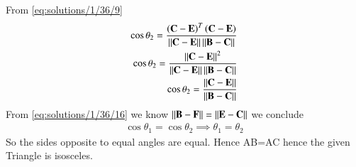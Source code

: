         From {\eqref{eq:solutions/1/36/9}}
        \begin{align}
          \cos{\theta_2}=\frac{\left(\mathbf{C}-\mathbf{E}\right)^T\left(\mathbf{C}-\mathbf{E}\right)}{\left\lVert\mathbf{C}-\mathbf{E}\right\rVert\left\lVert\mathbf{B}-\mathbf{C}\right\rVert} \\
          \cos{\theta_2}=\frac{\left\lVert\mathbf{C}-\mathbf{E}\right\rVert^2}{\left\lVert\mathbf{C}-\mathbf{E}\right\rVert\left\lVert\mathbf{B}-\mathbf{C}\right\rVert}\\
          \cos{\theta_2}=\frac{\left\lVert\mathbf{C}-\mathbf{E}\right\rVert}{\left\lVert\mathbf{B}-\mathbf{C}\right\rVert}
        \end{align}
        From \eqref{eq:solutions/1/36/16} we know $\left\lVert\mathbf{B}-\mathbf{F}\right\rVert=\left\lVert\mathbf{E}-\mathbf{C}\right\rVert$ we conclude
        \begin{align}
            \cos\theta_1=\cos\theta_2
            \implies\theta_1=\theta_2
        \end{align}
        So the sides opposite to equal angles are equal. Hence AB=AC hence the given Triangle is isosceles.
